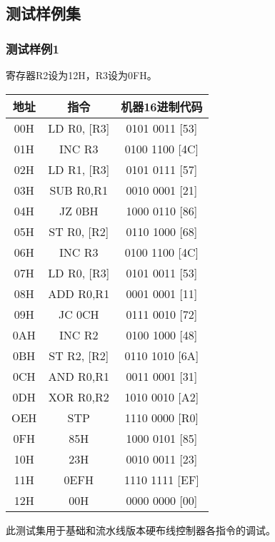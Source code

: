 \subsection{测试样例集}
\subsubsection{测试样例1}
寄存器R2设为12H，R3设为0FH。
\begin{table}[h]
    \centering
    \begin{tabular}[c]{|c|c|c|}
        \hline
        地址  & 指令          & 机器16进制代码       \\
        \hline
        00H & LD R0, [R3] & 0101 0011 [53] \\
        \hline
        01H & INC R3      & 0100 1100 [4C] \\
        \hline
        02H & LD R1, [R3] & 0101 0111 [57] \\
        \hline
        03H & SUB R0,R1   & 0010 0001 [21] \\
        \hline
        04H & JZ 0BH      & 1000 0110 [86] \\
        \hline
        05H & ST R0, [R2] & 0110 1000 [68] \\
        \hline
        06H & INC R3      & 0100 1100 [4C] \\
        \hline
        07H & LD R0, [R3] & 0101 0011 [53] \\
        \hline
        08H & ADD R0,R1   & 0001 0001 [11] \\
        \hline
        09H & JC 0CH      & 0111 0010 [72] \\
        \hline
        0AH & INC R2      & 0100 1000 [48] \\
        \hline
        0BH & ST R2, [R2] & 0110 1010 [6A] \\
        \hline
        0CH & AND R0,R1   & 0011 0001 [31] \\
        \hline
        0DH & XOR R0,R2   & 1010 0010 [A2] \\
        \hline
        OEH & STP         & 1110 0000 [R0] \\
        \hline
        0FH & 85H         & 1000 0101 [85] \\
        \hline
        10H & 23H         & 0010 0011 [23] \\
        \hline
        11H & 0EFH        & 1110 1111 [EF] \\
        \hline
        12H & 00H         & 0000 0000 [00] \\
        \hline
    \end{tabular}
\end{table}
此测试集用于基础和流水线版本硬布线控制器各指令的调试。

